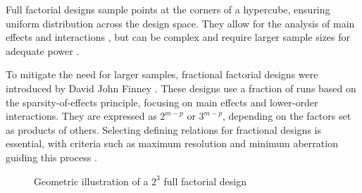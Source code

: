\documentclass [PhD] {package/uclathes}
\begin{document}
Full factorial designs sample points at the corners of a hypercube, ensuring uniform distribution across the design space. They allow for the analysis of main effects and interactions \parencite{montgomery2017design}, but can be complex and require larger sample sizes for adequate power \parencite{tabachnick2019}.

To mitigate the need for larger samples, fractional factorial designs were introduced by David John Finney \parencite{finney1945fractional}. These designs use a fraction of runs based on the sparsity-of-effects principle, focusing on main effects and lower-order interactions. They are expressed as \(2^{m-p}\) or \(3^{m-p}\), depending on the factors set as products of others. Selecting defining relations for fractional designs is essential, with criteria such as maximum resolution and minimum aberration guiding this process \parencite{wu2011experiments}.
\begin{figure}%
\centering

\caption{Geometric illustration of a $2^3$ full factorial design}\label{fig:ffd}
\end{figure}
\end{document}

